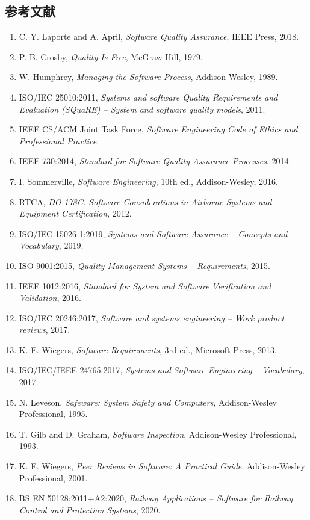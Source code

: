 \subsection{参考文献}
\begin{enumerate}
  \item C. Y. Laporte and A. April, \textit{Software Quality Assurance}, IEEE Press, 2018.
  \item P. B. Crosby, \textit{Quality Is Free}, McGraw-Hill, 1979.
  \item W. Humphrey, \textit{Managing the Software Process}, Addison-Wesley, 1989.
  \item ISO/IEC 25010:2011, \textit{Systems and software Quality Requirements and Evaluation (SQuaRE) -- System and software quality models}, 2011.
  \item IEEE CS/ACM Joint Task Force, \textit{Software Engineering Code of Ethics and Professional Practice}.
  \item IEEE 730:2014, \textit{Standard for Software Quality Assurance Processes}, 2014.
  \item I. Sommerville, \textit{Software Engineering}, 10th ed., Addison-Wesley, 2016.
  \item RTCA, \textit{DO-178C: Software Considerations in Airborne Systems and Equipment Certification}, 2012.
  \item ISO/IEC 15026-1:2019, \textit{Systems and Software Assurance -- Concepts and Vocabulary}, 2019.
  \item ISO 9001:2015, \textit{Quality Management Systems -- Requirements}, 2015.
  \item IEEE 1012:2016, \textit{Standard for System and Software Verification and Validation}, 2016.
  \item ISO/IEC 20246:2017, \textit{Software and systems engineering -- Work product reviews}, 2017.
  \item K. E. Wiegers, \textit{Software Requirements}, 3rd ed., Microsoft Press, 2013.
  \item ISO/IEC/IEEE 24765:2017, \textit{Systems and Software Engineering -- Vocabulary}, 2017.
  \item N. Leveson, \textit{Safeware: System Safety and Computers}, Addison-Wesley Professional, 1995.
  \item T. Gilb and D. Graham, \textit{Software Inspection}, Addison-Wesley Professional, 1993.
  \item K. E. Wiegers, \textit{Peer Reviews in Software: A Practical Guide}, Addison-Wesley Professional, 2001.
  \item BS EN 50128:2011+A2:2020, \textit{Railway Applications -- Software for Railway Control and Protection Systems}, 2020.

\end{enumerate}
